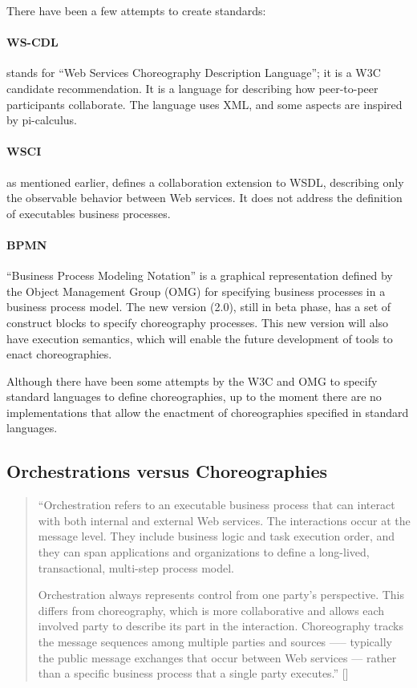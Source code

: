 There have been a few attempts to create standards:

\paragraph{WS-CDL}
stands for ``Web Services Choreography Description Language''; it is a W3C candidate recommendation. It is a language for describing how peer-to-peer participants collaborate. The language uses XML, and some aspects are inspired by pi-calculus.

\paragraph{WSCI}
as mentioned earlier, defines a collaboration extension to WSDL, describing only the observable behavior between Web services. It does not address the definition of executables business processes.

\paragraph{BPMN}
``Business Process Modeling Notation'' is a graphical representation defined by the Object Management Group (OMG) for specifying business processes in a business process model. The new version (2.0), still in beta phase, has a set of construct blocks to specify choreography processes. This new version will also have execution semantics, which will enable the future development of tools to enact choreographies.

Although there have been some attempts by the W3C and OMG to specify standard languages to define choreographies, up to the moment there are no implementations that allow the enactment of choreographies specified in standard languages.

\subsection{Orchestrations versus Choreographies}

\begin{quotation}
	``Orchestration refers to an executable business process that can interact with both internal and external Web services. The interactions occur at the message level. They include business logic and task execution order, and they can span applications and organizations to define a long-lived, transactional, multi-step process model.

	Orchestration always represents control from one party’s perspective. This differs from choreography, which is more collaborative and allows each involved party to describe its part in the interaction. Choreography tracks the message sequences among multiple parties and sources —-- typically the public message exchanges that occur between Web services --- rather than a specific business process that a single party executes.'' [\citet{WSOC}]
\end{quotation}


